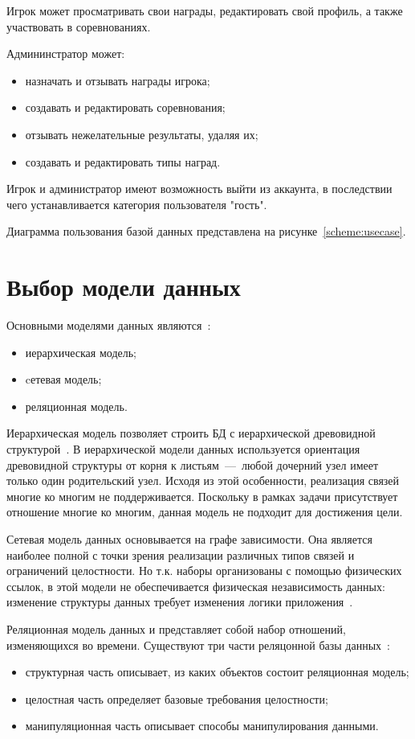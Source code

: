 Игрок может просматривать свои награды, редактировать свой профиль, а также участвовать в соревнованиях.

Админинстратор может:
\begin{itemize}
	\item назначать и отзывать награды игрока;
	\item создавать и редактировать соревнования;
	\item отзывать нежелательные результаты, удаляя их;
	\item создавать и редактировать типы наград.
\end{itemize}

Игрок и администратор имеют возможность выйти из аккаунта, в последствии чего устанавливается категория пользователя "гость".

Диаграмма пользования базой данных представлена на рисунке~\ref{scheme:usecase}.


\section{Выбор модели данных}

Основными моделями данных являются~\cite{karpova}:
\begin{itemize}
	\item иерархическая модель;
	\item cетевая модель;
	\item реляционная модель.
\end{itemize}

Иерархическая модель позволяет строить БД с иерархической древовидной структурой~\cite{karpova}. В иерархической модели данных используется ориентация древовидной
структуры от корня к листьям~---~любой дочерний узел имеет только один родительский узел. Исходя из этой особенности, реализация связей многие ко многим не поддерживается.
Поскольку в рамках задачи присутствует отношение многие ко многим, данная модель не подходит для достижения цели.

Сетевая модель данных основывается на графе зависимости. Она является наиболее полной с точки зрения реализации различных типов связей и ограничений целостности. Но т.к. наборы организованы с помощью физических ссылок, в этой модели не обеспечивается физическая независимость данных: изменение структуры данных требует изменения логики приложения~\cite{karpova}.


Реляционная модель данных и представляет собой набор отношений, изменяющихся во времени. Существуют три части реляцонной базы данных~\cite{relationdb}:
\begin{itemize}
	\item структурная часть описывает, из каких объектов состоит реляционная модель;
	\item целостная часть определяет базовые требования целостности;
	\item манипуляционная часть описывает способы манипулирования данными.
\end{itemize}

